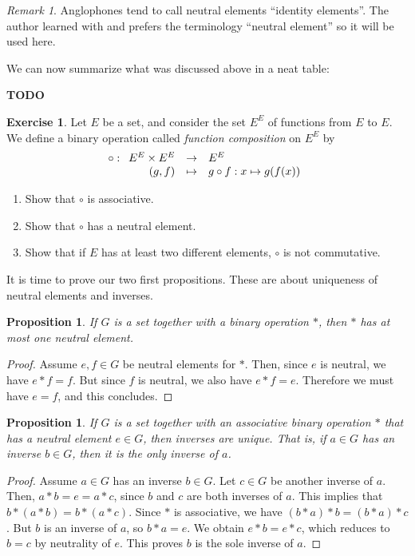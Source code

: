 \documentclass{book}
\newcommand{\todo}{\textbf{TODO}}
\newcommand{\applic}[4]{\begin{array}[t]{rcl}
#1 & \to & #2 \\
#3 & \mapsto & #4
\end{array}}
\theoremstyle{plain}
\newtheorem{proposition}[theorem]{Proposition}
\theoremstyle{definition}
\newtheorem{exercise}{Exercise}[section]
\theoremstyle{remark}
\newtheorem*{remark}{Remark}
\begin{document}
\begin{remark}
    Anglophones tend to call neutral elements ``identity elements''. The author learned with and prefers the terminology ``neutral element'' so it will be used here. 
\end{remark}

We can now summarize what was discussed above in a neat table:

\todo

\begin{exercise}
    Let $E$ be a set, and consider the set $E^E$ of functions from $E$ to $E$. We define a binary operation called \emph{function composition} on $E^E$ by
    \[\circ : \applic{E^E \times E^E}{E^E}{(g,f)}{g \circ f : x\mapsto g(f(x))}\]
    \begin{enumerate}
        \item Show that $\circ$ is associative.
        \item Show that $\circ$ has a neutral element.
        \item Show that if $E$ has at least two different elements, $\circ$ is not commutative.
    \end{enumerate}
\end{exercise}

It is time to prove our two first propositions. These are about uniqueness of neutral elements and inverses.

\begin{proposition}
    If $G$ is a set together with a binary operation $*$, then $*$ has at most one neutral element.
\end{proposition}

\begin{proof}
    Assume $e,f \in G$ be neutral elements for $*$. Then, since $e$ is neutral, we have $e * f = f$. But since $f$ is neutral, we also have $e * f = e$. Therefore we must have $e = f$, and this concludes.
\end{proof}

\begin{proposition}
    If $G$ is a set together with an associative binary operation $*$ that has a neutral element $e\in G$, then inverses are unique. That is, if $a \in G$ has an inverse $b\in G$, then it is the only inverse of $a$.
\end{proposition}

\begin{proof}
    Assume $a \in G$ has an inverse $b \in G$. Let $c \in G$ be another inverse of $a$. Then, $a * b = e = a *c$, since $b$ and $c$ are both inverses of $a$. This implies that $b * (a * b) = b * (a * c)$. Since $*$ is associative, we have $(b * a) * b = (b * a) * c$. But $b$ is an inverse of $a$, so $b * a = e$. We obtain $e * b = e * c$, which reduces to $b = c$ by neutrality of $e$. This proves $b$ is the sole inverse of $a$.
\end{proof}
\end{document}
